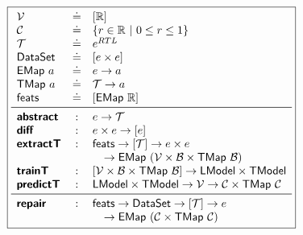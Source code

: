 \begin{figure}
\small
\begin{minipage}[c]{\linewidth}
  \lstDeleteShortInline{|}
  \[
  \boxed{
  \begin{array}{lcl}
    \V           & \defeq & \List{\R}\\
    \Runit       & \defeq & \{r \in \R\ |\ 0 \le r \le 1\} \\
    \T           & \defeq & e^{RTL} \\
    \Dataset     & \defeq & \List{e \times e} \\
    \Emap{a}     & \defeq & e \to a \\
    \Tmap{a}     & \defeq & \T \to a \\
    \featuresym  & \defeq & \List{\Emap{\R}} \\
    \midrule
    \abstrsym    & : & e \to \T \\
    \diffsym     & : & e \times e \to \List{e} \\
    \extractTsym & : & \featuresym \to \List{\T} \to e \times e \\
                 &   & \quad \to \Emap{(\V \times \B \times \Tmap{\B})} \\
    \trainTsym   & : & \List{\V \times \B \times \Tmap{\B}} \to \Model \times \ModelT \\
    \predictTsym & : & \Model \times \ModelT \to \V \to \Runit \times \Tmap{\Runit} \\
    \midrule
    \repairsym   & : & \featuresym \to \Dataset \to \List{\T} \to e \\
                 &   & \quad \to \Emap{(\Runit \times \Tmap{\Runit})}
  \end{array}
  }
  \]
  \lstMakeShortInline[mathescape=true]{|}
  \label{fig:api}
\end{minipage}
\end{figure}
